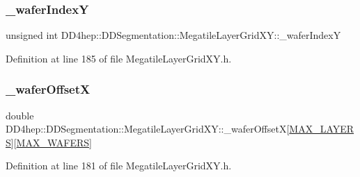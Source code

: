\hypertarget{class_d_d4hep_1_1_d_d_segmentation_1_1_megatile_layer_grid_x_y_a42e3bd719291c17dafe836762a6d7f02}{}\label{class_d_d4hep_1_1_d_d_segmentation_1_1_megatile_layer_grid_x_y_a42e3bd719291c17dafe836762a6d7f02} 
\subsubsection{\texorpdfstring{\+\_\+wafer\+IndexY}{\_waferIndexY}}
{\footnotesize\ttfamily unsigned int D\+D4hep\+::\+D\+D\+Segmentation\+::\+Megatile\+Layer\+Grid\+X\+Y\+::\+\_\+wafer\+IndexY\hspace{0.3cm}{\ttfamily [protected]}}



Definition at line 185 of file Megatile\+Layer\+Grid\+X\+Y.\+h.

\hypertarget{class_d_d4hep_1_1_d_d_segmentation_1_1_megatile_layer_grid_x_y_a631f3f1389a8cf6f1f83489aa788d558}{}\label{class_d_d4hep_1_1_d_d_segmentation_1_1_megatile_layer_grid_x_y_a631f3f1389a8cf6f1f83489aa788d558} 
\subsubsection{\texorpdfstring{\+\_\+wafer\+OffsetX}{\_waferOffsetX}}
{\footnotesize\ttfamily double D\+D4hep\+::\+D\+D\+Segmentation\+::\+Megatile\+Layer\+Grid\+X\+Y\+::\+\_\+wafer\+OffsetX\mbox{[}\hyperlink{_megatile_layer_grid_x_y_8h_ade9d4b2ac5f29fe89ffea40e7c58c9d6}{M\+A\+X\+\_\+\+L\+A\+Y\+E\+RS}\mbox{]}\mbox{[}\hyperlink{_d_d_segmentation_2include_2_d_d_segmentation_2_wafer_grid_x_y_8h_ace2f1e396fdb2a1510290218c8cb476a}{M\+A\+X\+\_\+\+W\+A\+F\+E\+RS}\mbox{]}\hspace{0.3cm}{\ttfamily [protected]}}



Definition at line 181 of file Megatile\+Layer\+Grid\+X\+Y.\+h.



